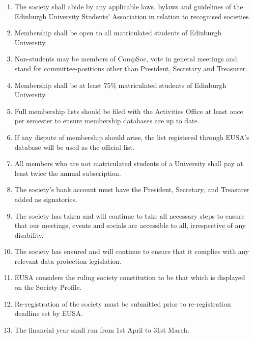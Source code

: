 \begin{enumerate}
\item The society shall abide by any applicable laws, bylaws and guidelines of the Edinburgh University Students' Association in relation to recognised societies.

\item Membership shall be open to all matriculated students of Edinburgh University.

\item Non-students may be members of CompSoc, vote in general meetings and stand for committee-positions other than President, Secretary and Treasurer.

\item Membership shall be at least 75\% matriculated students of Edinburgh University.

\item Full membership lists should be filed with the Activities Office at least once per semester to ensure membership databases are up to date.

\item If any dispute of membership should arise, the list registered through EUSA's database will be used as the official list.

\item All members who are not matriculated students of a University shall pay at least twice the annual subscription.

\item The society's bank account must have the President, Secretary, and Treasurer added as signatories.

\item The society has taken and will continue to take all necessary steps to ensure that our meetings, events and socials are accessible to all, irrespective of any disability.

\item The society has ensured and will continue to ensure that it complies with any relevant data protection legislation.

\item EUSA considers the ruling society constitution to be that which is displayed on the Society Profile.

\item Re-registration of the society must be submitted prior to re-registration deadline set by EUSA\@.

\item The financial year shall run from 1st April to 31st March.


\end{enumerate}
